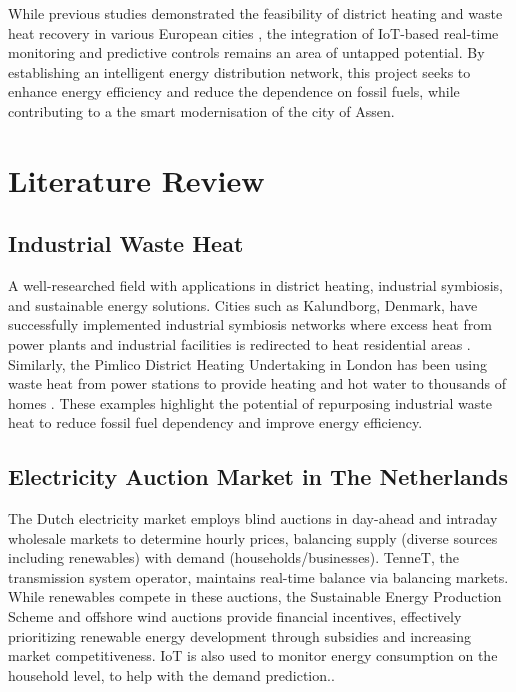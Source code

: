 \documentclass{article}
\begin{document}
While previous studies demonstrated the feasibility of district heating and waste heat recovery in various European cities \cite{kalundborg}, the integration of IoT-based real-time monitoring and predictive controls remains an area of untapped potential. By establishing an intelligent energy distribution network, this project seeks to enhance energy efficiency and reduce the dependence on fossil fuels, while contributing to a the smart modernisation of the city of Assen.

\section{Literature Review}

\subsection{Industrial Waste Heat}
A well-researched field with applications in district heating, industrial symbiosis, and sustainable energy solutions. Cities such as Kalundborg, Denmark, have successfully implemented industrial symbiosis networks where excess heat from power plants and industrial facilities is redirected to heat residential areas \cite{kalundborg}. 
Similarly, the Pimlico District Heating Undertaking in London has been using waste heat from power stations to provide heating and hot water to thousands of homes \cite{pimlico}. These examples highlight the potential of repurposing industrial waste heat to reduce fossil fuel dependency and improve energy efficiency.

\subsection{Electricity Auction Market in The Netherlands}
The Dutch electricity market employs blind auctions in day-ahead and intraday wholesale markets to determine hourly prices, balancing supply (diverse sources including renewables) with demand (households/businesses). TenneT, the transmission system operator, maintains real-time balance via balancing markets\cite{tennetmarketfacilitation}. While renewables compete in these auctions, the Sustainable Energy
Production Scheme and offshore wind auctions provide financial incentives\cite{dutchoffshorewind}, effectively prioritizing renewable energy development through subsidies and increasing market competitiveness. IoT is also used to monitor energy consumption on the household level, to help with the demand prediction.\cite{cbs2022slimmeapparaten}.
\end{document}
